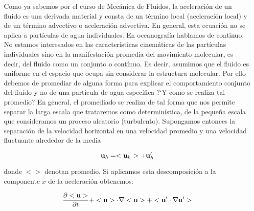 \documentclass[
]{agujournal2019}
\begin{document}
\begin{itemize}
Como ya sabemos por el curso de Mecánica de Fluidos, la aceleración de
un fluido es una derivada material y consta de un término local (aceleración local) y
de un término advectivo o aceleración advectiva.
En general, esta ecuación no se aplica a partículas de agua individuales. En
oceanografía hablamos de continuo. No estamos interesados en las características
cinemáticas de las partículas individuales sino en la manifestación promedia
del movimiento molecular, es decir, del fluido como un conjunto o
contínuo. Es decir, asumimos que el fluido es uniforme en el espacio que
ocupa sin considerar la estructura molecular.
Por ello debemos de promediar de alguna forma para explicar el comportamiento
conjunto del fluído y no de una partícula de agua específica ?`Y como se realiza
tal promedio? En general, el promediado se realiza de tal forma que nos permite
separar la larga escala que trataremos como determinística, de la pequeña escala
que consideramos un proceso aleatorio (turbulento). Supongamos entonces la separación de la velocidad horizontal en una velocidad promedio y una velocidad fluctuante alrededor de la media

\begin{equation}
{\textbf u_h} = <{\textbf u_h}> + {\textbf u'_h}
\end{equation}

 donde $ < > $ denotan promedio. Si aplicamos esta descomposición a la componente $x$ de la aceleración obtenemos:

\begin{equation}
\frac{\partial <{\textbf u}>}{\partial t} +  <{\textbf u}> \cdot  { \nabla} <{\textbf u} >  + < {\textbf u'} \cdot {\nabla} {\textbf u}'> 
\end{equation}



\end{itemize}
\end{document}
